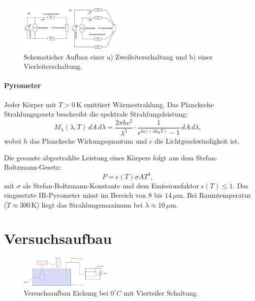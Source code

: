 \begin{figure}[h!]
    \centering
    \includegraphics[width=0.45\textwidth]{img/41/zwei_vier-Leiter.png}
    \caption{Schematicher Aufbau einer a) Zweileiterschaltung und b) einer Vierleiterschaltung.}
\end{figure}

\paragraph{Pyrometer}
Jeder Körper mit $T > 0\,$K emittiert Wärmestrahlung. Das Plancksche Strahlungsgesetz beschreibt die spektrale Strahlungsleistung:
\begin{equation}
    M_\lambda(\lambda,T)\,dA\,d\lambda = \frac{2\pi h c^2}{\lambda^5} \cdot \frac{1}{e^{hc/(\lambda k_{\mathrm{B}}T)} - 1} \, dA\,d\lambda,
\end{equation}
wobei $h$ das Plancksche Wirkungsquantum und $c$ die Lichtgeschwindigkeit ist.  

Die gesamte abgestrahlte Leistung eines Körpers folgt aus dem Stefan-Boltzmann-Gesetz:
\begin{equation}
    P = \epsilon(T) \sigma A T^4,
\end{equation}
mit $\sigma$ als Stefan-Boltzmann-Konstante und dem Emissionsfaktor $\epsilon(T) \leq 1$.  
Das eingesetzte IR-Pyrometer misst im Bereich von $8$ bis $14\,\mu$m. Bei Raumtemperatur ($T \approx 300\,$K) liegt das Strahlungsmaximum bei $\lambda \approx 10\,\mu$m.

\section{Versuchsaufbau}
    
\begin{figure}[h!]
    \centering
    \includegraphics[width=0.4\textwidth]{img/41/1.jpg}
    \caption{Versuchsaufbau Eichung bei $0^\circ C$ mit Vierteiler Schaltung.}
\end{figure}

